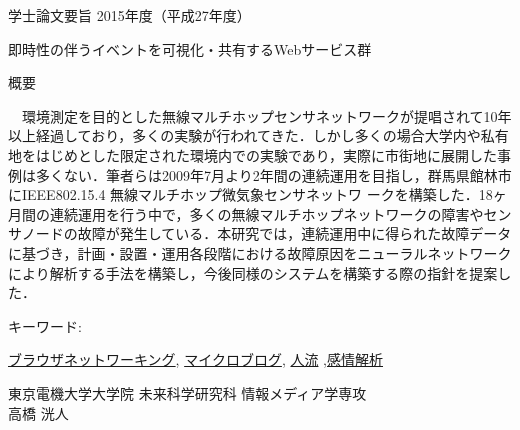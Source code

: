 \newpage
\pagestyle{plain}
\begin{center}
\LARGE{学士論文要旨 \hspace{10mm} 2015年度（平成27年度）}\\

\vspace{10mm}

\LARGE{即時性の伴うイベントを可視化・共有するWebサービス群}\\
\end{center}

\begin{center}
概要\\
\end{center}

　環境測定を目的とした無線マルチホップセンサネットワークが提唱されて10年以上経過しており，多くの実験が行われてきた．しかし多くの場合大学内や私有地をはじめとした限定された環境内での実験であり，実際に市街地に展開した事例は多くない．筆者らは2009年7月より2年間の連続運用を目指し，群馬県館林市にIEEE802.15.4 無線マルチホップ微気象センサネットワ ークを構築した．18ヶ月間の連続運用を行う中で，多くの無線マルチホップネットワークの障害やセンサノードの故障が発生している．本研究では，連続運用中に得られた故障データに基づき，計画・設置・運用各段階における故障原因をニューラルネットワークにより解析する手法を構築し，今後同様のシステムを構築する際の指針を提案した．

\begin{flushleft}キーワード:\\
\end{flushleft}
{\underline{ブラウザネットワーキング}, \underline{マイクロブログ}, \underline{人流} ,\underline{感情解析} }


\begin{center}
\vspace{10mm}
\begin{flushright}\large 東京電機大学大学院 未来科学研究科 情報メディア学専攻\\
\LARGE 高橋 洸人\\
\end{flushright}
\end{center}

\newpage

